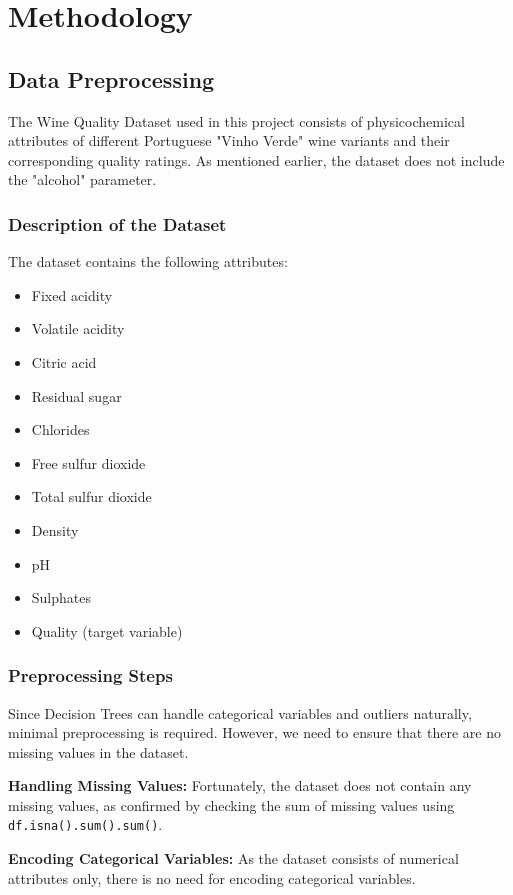 \documentclass{ufazreport}
\begin{document}
\section{Methodology}

\subsection{Data Preprocessing}

The Wine Quality Dataset used in this project consists of physicochemical attributes of different Portuguese "Vinho Verde" wine variants and their corresponding quality ratings. As mentioned earlier, the dataset does not include the "alcohol" parameter.

\subsubsection{Description of the Dataset}

The dataset contains the following attributes:
\begin{itemize}
    \item Fixed acidity
    \item Volatile acidity
    \item Citric acid
    \item Residual sugar
    \item Chlorides
    \item Free sulfur dioxide
    \item Total sulfur dioxide
    \item Density
    \item pH
    \item Sulphates
    \item Quality (target variable)
\end{itemize}

\subsubsection{Preprocessing Steps}

Since Decision Trees can handle categorical variables and outliers naturally, minimal preprocessing is required. However, we need to ensure that there are no missing values in the dataset.

\textbf{Handling Missing Values:} Fortunately, the dataset does not contain any missing values, as confirmed by checking the sum of missing values using \texttt{df.isna().sum().sum()}.

\textbf{Encoding Categorical Variables:} As the dataset consists of numerical attributes only, there is no need for encoding categorical variables.
\end{document}
